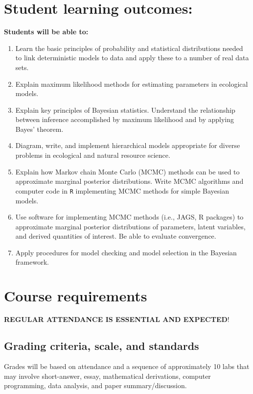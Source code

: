 \documentclass[11pt, a4paper]{article}
\begin{document}

\section*{Student learning outcomes:}
\textbf{Students will be able to:}
\begin{enumerate}
\item Learn the basic principles of probability and statistical
  distributions needed to link deterministic models to data and apply these to a number of real data sets.
\item Explain maximum likelihood methods for estimating parameters in
  ecological models.
\item Explain key principles of Bayesian statistics. Understand the
  relationship between inference accomplished by maximum likelihood
  and by applying Bayes’ theorem.
\item Diagram, write, and implement hierarchical models
  appropriate for diverse problems in ecological and natural resource science.
\item Explain how Markov chain Monte Carlo (MCMC) methods can be used
  to approximate marginal posterior distributions. Write MCMC
  algorithms and computer code in \texttt{R} implementing MCMC methods
  for simple Bayesian models.
\item Use software for implementing MCMC methods (i.e., JAGS, R
  packages) to approximate marginal posterior distributions of
  parameters, latent variables, and derived quantities of interest. Be
  able to evaluate convergence.
\item Apply procedures for model checking and model selection in
  the Bayesian framework.
\end{enumerate}


\section*{Course requirements}
\noindent \textbf{REGULAR ATTENDANCE IS ESSENTIAL AND EXPECTED}! 


\subsection*{Grading criteria, scale, and standards}

\noindent Grades will be based on attendance and a
sequence of approximately 10 labs that may involve
short-answer, essay, mathematical derivations, computer programming,
data analysis, and paper summary/discussion.
\end{document}
